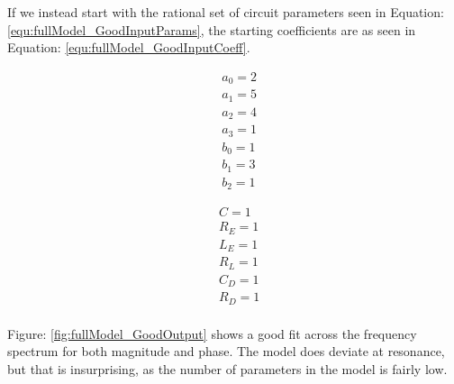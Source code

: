 If we instead start with the rational set of circuit parameters seen in Equation: \eqref{equ:fullModel_GoodInputParams}, the starting coefficients are as seen in Equation: \eqref{equ:fullModel_GoodInputCoeff}.

\begin{multicols}{2}
\begin{equation}
\label{equ:fullModel_GoodInputCoeff}
\begin{split}
&a_0 = 2 \\
&a_1 = 5 \\
&a_2 = 4 \\
&a_3 = 1 \\
&b_0 = 1 \\
&b_1 = 3 \\
&b_2 = 1
\end{split}
\end{equation}

\begin{equation}
\label{equ:fullModel_GoodInputParams}
\begin{split}
&C   = 1 \\
&R_E = 1 \\
&L_E = 1 \\
&R_L = 1 \\
&C_D = 1 \\
&R_D = 1 \\
\end{split}
\end{equation}
\end{multicols}



Figure: \ref{fig:fullModel_GoodOutput} shows a good fit across the frequency spectrum for both magnitude and phase. The model does deviate at resonance, but that is insurprising, as the number of parameters in the model is fairly low.


